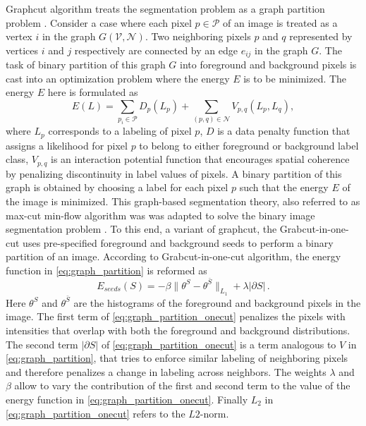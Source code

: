 \documentclass {udthesis}
\begin{document}
Graphcut algorithm treats the segmentation problem as a graph partition problem \cite{mincut_maxflow}. Consider a case where each pixel $p \in \mathcal{P}$ of an image is treated as a vertex $i$ in the graph $G(\mathcal{V},\mathcal{N})$. Two neighboring pixels $p$ and $q$ represented by vertices $i$ and $j$ respectively are connected by an edge $e_{ij}$ in the graph $G$. The task of binary partition of this graph $G$ into foreground and background pixels is cast into an optimization problem where the energy $E$ is to be minimized. The energy $E$ here is formulated as 
%
\begin{equation}	\label{eq:graph_partition}
  E(L)=\sum\limits_{p_i\in \mathcal{P}} D_p(L_p)+\sum\limits_{(p,q)\in \mathcal{N}} V_{p,q} (L_p,L_q),
\end{equation}
%
where $L_p$ corresponds to a labeling of pixel $p$, $D$ is a data penalty function that assigns a likelihood for pixel $p$ to belong to either foreground or background label class, $V_{p,q}$ is an interaction potential function that encourages spatial coherence by penalizing discontinuity in label values of pixels. A binary partition of this graph is obtained by choosing a label for each pixel $p$ such that the energy $E$ of the image is minimized. This graph-based segmentation theory, also referred to as max-cut min-flow algorithm was was adapted to solve the binary image segmentation problem \cite{onecut}. To this end, a variant of graphcut, the Grabcut-in-one-cut \cite{onecut} uses pre-specified foreground and background seeds to perform a binary partition of an image. According to Grabcut-in-one-cut algorithm, the energy function in \eqref{eq:graph_partition} is reformed as
%
\begin{equation} \label{eq:graph_partition_onecut}
  E_{seeds}(S)=-\beta \| \theta^S-\theta^{\bar{S}} \|_{L_1}+\lambda|\partial S|\,.
\end{equation}
%
Here $\theta^S$ and $\theta^{\bar{S}}$ are the histograms of the foreground and background pixels in the image. The first term of \eqref{eq:graph_partition_onecut} penalizes the pixels with intensities that overlap with both the foreground and background distributions. The second term $|\partial S|$ of \eqref{eq:graph_partition_onecut} is a term analogous to $V$ in \eqref{eq:graph_partition}, that tries to enforce similar labeling of neighboring pixels and therefore penalizes a change in labeling across neighbors. The weights $\lambda$ and $\beta$ allow to vary the contribution of the first and second term to the value of the energy function in \eqref{eq:graph_partition_onecut}. Finally $L_2$ in \eqref{eq:graph_partition_onecut} refers to the $L2$-norm.
\end{document}
